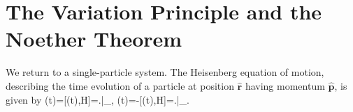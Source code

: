
\section{The Variation Principle and the Noether Theorem}

We return to a single-particle system. The Heisenberg equation of motion, describing the time evolution of a particle at position $\hat{\bm r}$ having momentum $\hat{\bm p}$, is given by
\be
\ii\hbar{}(t)=[(t),\hat H]=\left.\ii\hbar{}\right|_{},
\ee
\be
\ii\hbar{}(t)=-[(t),\hat H]=\left.\ii\hbar{}\right|_{}.
\ee